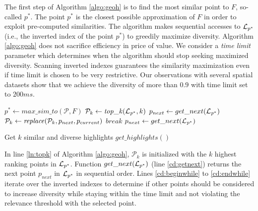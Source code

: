 \documentclass{vldb}
\begin{document}
\vspace{2pt}
The first step of Algorithm \ref{algo:geoh} is to find the most similar point to $F$, so-called $p^*$. The point $p^*$ is the closest possible approximation of $F$ in order to exploit pre-computed similarities. The algorithm makes sequential accesses to ${\cal L}_{p^*}$ (i.e., the inverted index of the point $p^*$) to greedily maximize diversity. Algorithm \ref{algo:geoh} does not sacrifice efficiency in price of value. We consider a {\em time limit} parameter which determines when the algorithm should stop seeking maximized diversity. Scanning inverted indexes guarantees the similarity maximization even if time limit is chosen to be very restrictive. Our observations with several spatial datasets show that we achieve the diversity of more than $0.9$ with time limit set to $200ms$.


\begin{algorithm}[t]
\DontPrintSemicolon
{}
$p^* \gets \mathit{max\_sim\_to}(\mathcal{P},F)$\;
$\mathcal{P}_k \gets \mathit{top\_k}(\mathit{{\cal L}_{p^*}},k)$\label{ln:topk}\;
$p_{next} \gets get\_next(\mathit{{\cal L}_{p^*}})$\;\label{cd:getnext}
       {\label{cd:beginwhile}
              {
                     {\label{cd:betterdiv}
                     ${\cal P}_k \gets \mathit{replace}({\cal P}_k,p_{next},p_{current})$\;
                            $break$\;
                     }
              }
              $p_{next} \gets get\_next(\mathit{{\cal L}_{p^*}})$\;}\label{cd:endwhile}
       \; 
       \caption{Get $k$ similar and diverse highlights $\mathit{get\_highlights}()$}
       \label{algo:geoh}
\end{algorithm}

\vspace{2pt}
In line \ref{ln:topk} of Algorithm \ref{algo:geoh}, $\mathcal{P}_k$ is initialized with the $k$ highest ranking points in ${\cal L}_{p^*}$. Function $get\_next({\cal L}_{p^*})$ (line \ref{cd:getnext}) returns the next point $p_{next}$ in ${\cal L}_{p^*}$ in sequential order. Lines \ref{cd:beginwhile} to \ref{cd:endwhile} iterate over the inverted indexes to determine if other points should be considered to increase diversity while staying within the time limit and not violating the relevance threshold with the selected point.
\end{document}
